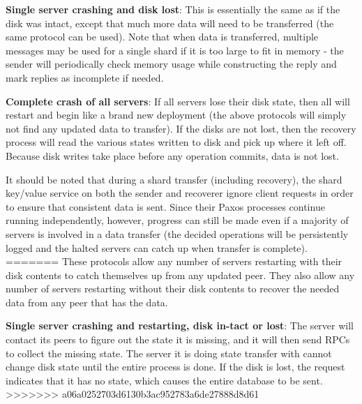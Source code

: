 \documentclass[letterpaper,10pt]{article}
\begin{document}
\begin{itemize}
\textbf{Single server crashing and disk lost}:  This is essentially the same as if the disk was intact, except that much more data will need to be transferred (the same protocol can be used).  Note that when data is transferred, multiple messages may be used for a single shard if it is too large to fit in memory - the sender will periodically check memory usage while constructing the reply and mark replies as incomplete if needed.


\textbf{Complete crash of all servers}: If all servers lose their disk state, then all will restart and begin like a brand new deployment (the above protocols will simply not find any updated data to transfer). If the disks are not lost, then the recovery process will read the various
states written to disk and pick up where it left off.  Because disk writes take place before any operation commits, data is not lost.

It should be noted that during a shard transfer (including recovery), the shard key/value service on both the sender and recoverer ignore client requests in order to ensure that consistent data is sent.  Since their Paxos processes continue running independently, however, progress can still be made even if a majority of servers is involved in a data transfer (the decided operations will be persistently logged and the halted servers can catch up when transfer is complete).  
=======
These protocols allow any number of servers restarting with their disk
contents to catch themselves up from any updated peer.  They also
allow any number of servers restarting without their disk contents to
recover the needed data from any peer that has the data.

\textbf{Single server crashing and restarting, disk in-tact or lost}:
The server will contact its peers to figure out the state it is
missing, and it will then send RPCs to collect the missing state. The
server it is doing state transfer with cannot change disk state until
the entire process is done. If the disk is lost, the request indicates
that it has no state, which causes the entire database to be sent.
>>>>>>> a06a0252703d6130b3ac952783a6de27888d8d61


\end{itemize}
\end{document}
